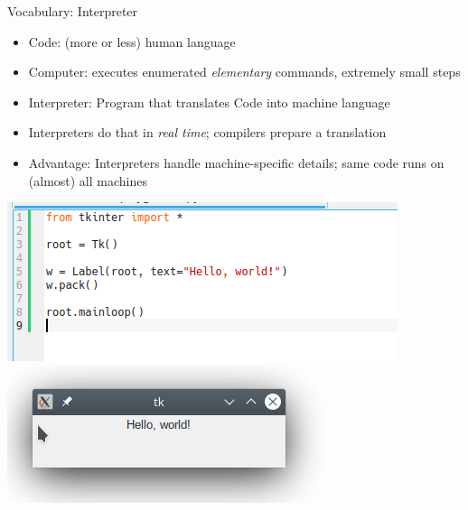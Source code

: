 \begin{frame}{Vocabulary: Interpreter}
%
\begin{minipage}{.49\linewidth}
\begin{itemize}
\item Code: (more or less) human language
\item Computer: executes enumerated \emph{elementary} commands, extremely small steps
\item Interpreter: Program that translates Code into machine language
\item Interpreters do that in \emph{real time}; compilers prepare a translation
\item Advantage: Interpreters handle machine-specific details; same code runs on (almost) all machines
\end{itemize}
\end{minipage}
%
%
\begin{minipage}[t]{.49\linewidth}
\includegraphics[width=\linewidth]{./gfx/TK-HelloWorld-Code}
\includegraphics[width=\linewidth]{./gfx/TK-HelloWorld-Run}
\end{minipage}
%
\end{frame}


